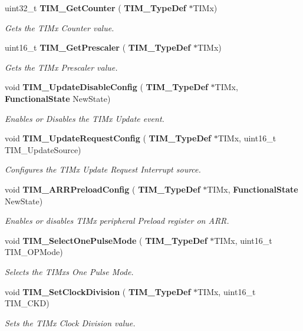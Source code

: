 \begin{DoxyCompactItemize}
uint32\+\_\+t \textbf{ T\+I\+M\+\_\+\+Get\+Counter} (\textbf{ T\+I\+M\+\_\+\+Type\+Def} $\ast$T\+I\+Mx)
\begin{DoxyCompactList}\small\item\em Gets the T\+I\+Mx Counter value. \end{DoxyCompactList}\item 
uint16\+\_\+t \textbf{ T\+I\+M\+\_\+\+Get\+Prescaler} (\textbf{ T\+I\+M\+\_\+\+Type\+Def} $\ast$T\+I\+Mx)
\begin{DoxyCompactList}\small\item\em Gets the T\+I\+Mx Prescaler value. \end{DoxyCompactList}\item 
void \textbf{ T\+I\+M\+\_\+\+Update\+Disable\+Config} (\textbf{ T\+I\+M\+\_\+\+Type\+Def} $\ast$T\+I\+Mx, \textbf{ Functional\+State} New\+State)
\begin{DoxyCompactList}\small\item\em Enables or Disables the T\+I\+Mx Update event. \end{DoxyCompactList}\item 
void \textbf{ T\+I\+M\+\_\+\+Update\+Request\+Config} (\textbf{ T\+I\+M\+\_\+\+Type\+Def} $\ast$T\+I\+Mx, uint16\+\_\+t T\+I\+M\+\_\+\+Update\+Source)
\begin{DoxyCompactList}\small\item\em Configures the T\+I\+Mx Update Request Interrupt source. \end{DoxyCompactList}\item 
void \textbf{ T\+I\+M\+\_\+\+A\+R\+R\+Preload\+Config} (\textbf{ T\+I\+M\+\_\+\+Type\+Def} $\ast$T\+I\+Mx, \textbf{ Functional\+State} New\+State)
\begin{DoxyCompactList}\small\item\em Enables or disables T\+I\+Mx peripheral Preload register on A\+RR. \end{DoxyCompactList}\item 
void \textbf{ T\+I\+M\+\_\+\+Select\+One\+Pulse\+Mode} (\textbf{ T\+I\+M\+\_\+\+Type\+Def} $\ast$T\+I\+Mx, uint16\+\_\+t T\+I\+M\+\_\+\+O\+P\+Mode)
\begin{DoxyCompactList}\small\item\em Selects the T\+I\+Mx\textquotesingle{}s One Pulse Mode. \end{DoxyCompactList}\item 
void \textbf{ T\+I\+M\+\_\+\+Set\+Clock\+Division} (\textbf{ T\+I\+M\+\_\+\+Type\+Def} $\ast$T\+I\+Mx, uint16\+\_\+t T\+I\+M\+\_\+\+C\+KD)
\begin{DoxyCompactList}\small\item\em Sets the T\+I\+Mx Clock Division value. \end{DoxyCompactList}\item 

\end{DoxyCompactItemize}
